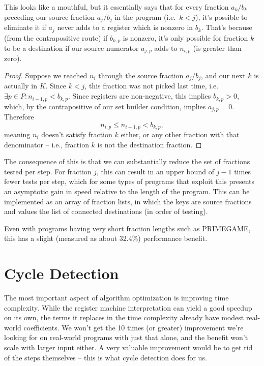 \documentclass[12pt]{article}
\begin{document}
This looks like a mouthful, but it essentially says that for every fraction $a_k/b_k$ preceding our source fraction $a_j/b_j$ in the program (i.e.\ $k < j$), it's possible to eliminate it if $a_j$ never adds to a register which is nonzero in $b_k$. That's because (from the contrapositive route) if $b_{k,p}$ is nonzero, it's only possible for fraction $k$ to be a destination if our source numerator $a_{j,p}$ adds to $n_{i,p}$ (is greater than zero).

\begin{proof}
Suppose we reached $n_i$ through the source fraction $a_j/b_j$, and our next $k$ is actually in $K$. Since $k < j$, this fraction was not picked last time, i.e.\ $\exists p \in P : n_{i-1,p} < b_{k,p}$. Since registers are non-negative, this implies $b_{k,p} > 0$, which, by the contrapositive of our set builder condition, implies $a_{j,p} = 0$. Therefore
\[
n_{i,p} \leq n_{i-1,p} < b_{k,p},
\]
meaning $n_i$ doesn't satisfy fraction $k$ either, or any other fraction with that denominator -- i.e., fraction $k$ is not the destination fraction.
\end{proof}

The consequence of this is that we can substantially reduce the set of fractions tested per step. For fraction $j$, this can result in an upper bound of $j-1$ times fewer tests per step, which for some types of programs that exploit this presents an asymptotic gain in speed relative to the length of the program. This can be implemented as an array of fraction lists, in which the keys are source fractions and values the list of connected destinations (in order of testing).

Even with programs having very short fraction lengths such as PRIMEGAME, this has a slight (measured as about 32.4\%) performance benefit.

\section{Cycle Detection}

The most important aspect of algorithm optimization is improving time complexity. While the register machine interpretation can yield a good speedup on its own, the terms it replaces in the time complexity already have modest real-world coefficients. We won't get the 10 times (or greater) improvement we're looking for on real-world programs with just that alone, and the benefit won't scale with larger input either. A very valuable improvement would be to get rid of the steps themselves -- this is what cycle detection does for us.
\end{document}
